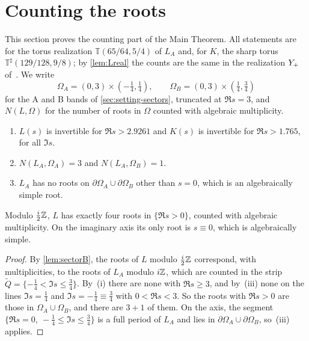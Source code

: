 \section{Counting the roots}\label{sec:counting}

This section proves the counting part of the Main Theorem. All statements are for the torus realization
$\mathbb T(65/64,5/4)$ of $L_A$ and, for $K$, the sharp torus $\mathbb T^\sharp(129/128,9/8)$; by
\cref{lem:Lreal} the counts are the same in the realization $Y_{+}$ of~\cite{RT2019}. We write
\[
  \Omega_A=(0,3)\times(-\tfrac14,\tfrac14),\qquad \Omega_B=(0,3)\times(\tfrac14,\tfrac34)
\]
for the A and B bands of \cref{sec:setting-sectors}, truncated at $\Re s=3$, and $N(L,\Omega)$ for the
number of roots in $\Omega$ counted with algebraic multiplicity.

\begin{theorem}[Counts]\label{thm:counts}
\begin{enumerate}[label=\textup{(\roman*)},leftmargin=*]
\item $L(s)$ is invertible for $\Re s>2.9261$ and $K(s)$ is invertible for $\Re s>1.765$, for all $\Im s$.
\item $N(L_A,\Omega_A)=3$ and $N(L_A,\Omega_B)=1$.
\item $L_A$ has no roots on $\partial\Omega_A\cup\partial\Omega_B$ other than $s=0$, which is an algebraically
  simple root.
\end{enumerate}
\end{theorem}

\begin{corollary}\label{cor:four}
Modulo $\tfrac i2\mathbb{Z}$, $L$ has exactly four roots in $\{\Re s>0\}$, counted with algebraic multiplicity. On the
imaginary axis its only root is $s\equiv0$, which is algebraically simple.
\end{corollary}

\begin{proof}
By \cref{lem:sectorB}, the roots of $L$ modulo $\tfrac i2\mathbb{Z}$ correspond, with multiplicities, to the roots of
$L_A$ modulo $i\mathbb{Z}$, which are counted in the strip $\widetilde Q=\{-\tfrac14<\Im s\le\tfrac34\}$. By~(i)
there are none with $\Re s\ge3$, and by~(iii) none on the lines $\Im s=\tfrac14$ and $\Im s=-\tfrac14\equiv\tfrac34$
with $0<\Re s<3$. So the roots with $\Re s>0$ are those in $\Omega_A\cup\Omega_B$, and there are $3+1$ of
them. On the axis, the segment $\{\Re s=0,\ -\tfrac14\le\Im s\le\tfrac34\}$ is a full period of $L_A$ and lies
in $\partial\Omega_A\cup\partial\Omega_B$, so~(iii) applies.
\end{proof}

